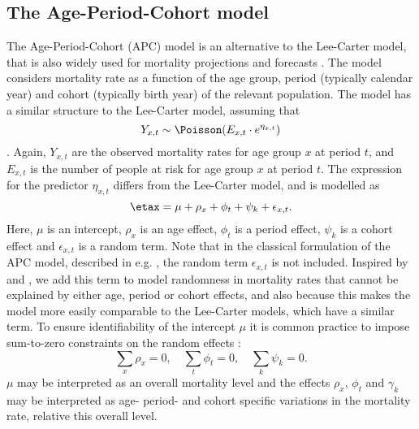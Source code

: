 \subsection{The Age-Period-Cohort model}
\label{sec:APC-model}
The Age-Period-Cohort (APC) model is an alternative to the Lee-Carter model, that is also widely used for mortality projections and forecasts \parencite{rieblerHeld2010}. The model considers mortality rate as a function of the age group, period (typically calendar year) and cohort (typically birth year) of the relevant population. The model has a similar structure to the Lee-Carter model, assuming that 
\begin{equation}
    Y_{x,t} \sim \Poisson(E_{x,t}\cdot e^{\eta_{x,t}})
    \label{eq:APClikelihood}
\end{equation}
\parencite{RieblerThesis2010}. Again, $Y_{x,t}$ are the observed mortality rates for age group $x$ at period $t$, and $E_{x,t}$ is the number of people at risk for age group $x$ at period $t$. The expression for the predictor $\eta_{x,t}$ differs from the Lee-Carter model, and is modelled as
\begin{equation}
    \etax = \mu + \rho_x + \phi_t + \psi_k + \epsilon_{x,t}.
    \label{eq:APCmodel}
\end{equation}
Here, $\mu$ is an intercept, $\rho_x$ is an age effect, $\phi_t$ is a period effect, $\psi_k$ is a cohort effect and $\epsilon_{x,t}$ is a random term. Note that in the classical formulation of the APC model, described in e.g. \textcite{Clayton1987}, the random term $\epsilon_{x,t}$ is not included. Inspired by \textcite{RieblerThesis2010} and \textcite{Besag1995}, we add this term to model randomness in mortality rates that cannot be explained by either age, period or cohort effects, and also because this makes the model more easily comparable to the Lee-Carter models, which have a similar term. 
\newline
\noindent To ensure identifiability of the intercept $\mu$ it is common practice to impose sum-to-zero constraints on the random effects \parencite{RieblerThesis2010}:
\begin{equation}
    \sum_{x}\rho_x = 0, \quad \sum_{t}\phi_t = 0, \quad \sum_{k} \psi_k = 0. 
    \label{eq:APCconstraints}
\end{equation}
$\mu$ may be interpreted as an overall mortality level \parencite{RieblerThesis2010} and the effects $\rho_x$, $\phi_t$ and $\gamma_k$ may be interpreted as age- period- and cohort specific variations in the mortality rate, relative this overall level. 
